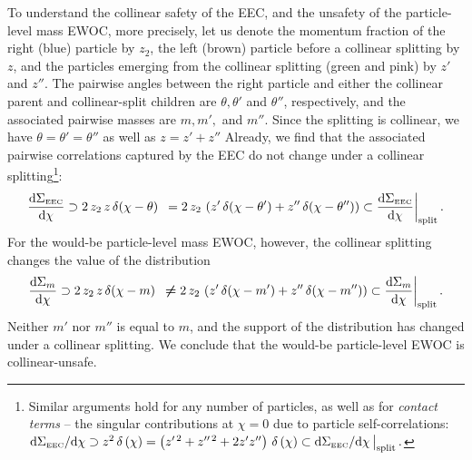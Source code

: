 To understand the collinear safety of the EEC, and the unsafety of the particle-level mass EWOC, more precisely, let us denote the momentum fraction of the right (blue) particle by \(z_2\), the left (brown) particle before a collinear splitting by \(z\), and the particles emerging from the collinear splitting (green and pink) by \(z'\) and \(z''\).
%
The pairwise angles between the right particle and either the collinear parent and collinear-split children are \(\theta,\theta'\) and \(\theta''\), respectively, and the associated pairwise masses are \(m, m',\) and \(m''\).
%
Since the splitting is collinear, we have \(\theta = \theta' = \theta''\) as well as \(z = z' + z''\)
%
Already, we find that the associated pairwise correlations captured by the EEC do not change under a collinear splitting\footnote{
    Similar arguments hold for any number of particles, as well as for \textit{contact terms} -- the singular contributions at \(\chi = 0\) due to particle self-correlations:
    \(
        \dd \Sigma_\text{\tiny EEC}/\dd \chi
        \supset
        z^2
        \, \delta\left(\chi\right)
        =
        \left(z^{\prime\,2} + z^{\prime\prime\,2} + 2 z^\prime z^{\prime\prime} \right)
        \, \delta\left(\chi\right)
        \subset
        \dd \Sigma_\text{\tiny EEC}/\dd \chi\,\big|_\text{split}
        \,.
    \)
}:
\begin{align}
    \label{eq:eec_safe}
    \frac{\dd \Sigma_\text{\tiny EEC}}{\dd \chi}
    \supset
    2 \, z_2 \, z
    \, \delta(\chi - \theta)
    \,\,\,
    =
    2 \, z_2 \, \le(
        z'
        \,
        \delta(\chi - \theta')
        +
        z''
        \,
        \delta(\chi - \theta'')
    \ri)
    \subset
    \frac{\dd \Sigma_\text{\tiny EEC}}{\dd \chi}\biggr|_\text{split}
    \,.
\end{align}
%
For the would-be particle-level mass EWOC, however, the collinear splitting changes the value of the distribution
\begin{align}
    \label{eq:m_ewoc_unsafe}
    \frac{\dd \Sigma_{m}}{\dd \chi}
    \supset
    2 \, z_2 \, z
    \, \delta(\chi - m)
    \,\,\,
    \boldsymbol{\neq}
    2 \, z_2 \, \le(
        z'
        \,
        \delta(\chi - m')
        +
        z''
        \,
        \delta(\chi - m'')
    \ri)
    \subset
    \frac{\dd \Sigma_{m}}{\dd \chi}
    \biggr|_\text{split}
    \,.
\end{align}
%
Neither \(m'\) nor \(m''\) is equal to \(m\), and the support of the distribution has changed under a collinear splitting.
%
We conclude that the would-be particle-level EWOC is collinear-unsafe.



